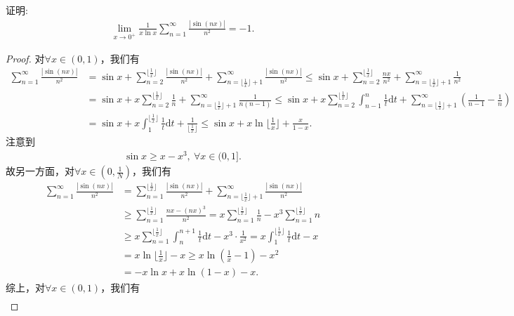 \documentclass[../../main.tex]{subfiles}%
\begin{document}
\begin{example}
证明:
\begin{align*}
\lim_{x \to 0^+} \frac{1}{x \ln x} \sum_{n=1}^{\infty} \frac{|\sin(nx)|}{n^2} = -1.
\end{align*}
\end{example}
\begin{proof}
对$\forall x\in (0,1)$，我们有
\begin{align*}
\sum_{n=1}^{\infty}\frac{|\sin(nx)|}{n^2} &= \sin x + \sum_{n=2}^{\lfloor \frac{1}{x} \rfloor}\frac{|\sin(nx)|}{n^2} + \sum_{n=\lfloor \frac{1}{x} \rfloor +1}^{\infty}\frac{|\sin(nx)|}{n^2} \leqslant \sin x + \sum_{n=2}^{\lfloor \frac{1}{x} \rfloor}\frac{nx}{n^2} + \sum_{n=\lfloor \frac{1}{x} \rfloor +1}^{\infty}\frac{1}{n^2} \\
&= \sin x + x\sum_{n=2}^{\lfloor \frac{1}{x} \rfloor}\frac{1}{n} + \sum_{n=\lfloor \frac{1}{x} \rfloor +1}^{\infty}\frac{1}{n(n-1)} \leqslant \sin x + x\sum_{n=2}^{\lfloor \frac{1}{x} \rfloor}\int_{n-1}^n\frac{1}{t}\mathrm{d}t + \sum_{n=\lfloor \frac{1}{x} \rfloor +1}^{\infty}\left( \frac{1}{n-1} - \frac{1}{n} \right) \\
&= \sin x + x\int_1^{\lfloor \frac{1}{x} \rfloor}\frac{1}{t}\mathrm{d}t + \frac{1}{\lfloor \frac{1}{x} \rfloor} \leqslant \sin x + x\ln \lfloor \frac{1}{x} \rfloor + \frac{x}{1-x}.
\end{align*}
注意到
\begin{align*}
\sin x\geqslant x-x^3,\ \forall x\in (0,1].
\end{align*}
故另一方面，对$\forall x\in (0,\frac{1}{N})$，我们有
\begin{align*}
\sum_{n=1}^{\infty}\frac{|\sin(nx)|}{n^2}&=\sum_{n=1}^{\lfloor \frac{1}{x} \rfloor}\frac{|\sin(nx)|}{n^2}+\sum_{n=\lfloor \frac{1}{x} \rfloor +1}^{\infty}\frac{|\sin(nx)|}{n^2} \\
&\geqslant \sum_{n=1}^{\lfloor \frac{1}{x} \rfloor}\frac{nx-(nx)^3}{n^2}=x\sum_{n=1}^{\lfloor \frac{1}{x} \rfloor}\frac{1}{n}-x^3\sum_{n=1}^{\lfloor \frac{1}{x} \rfloor}n \\
&\geqslant x\sum_{n=1}^{\lfloor \frac{1}{x} \rfloor}\int_n^{n+1}\frac{1}{t}\mathrm{d}t-x^3\cdot \frac{1}{x^2}=x\int_1^{\lfloor \frac{1}{x} \rfloor}\frac{1}{t}\mathrm{d}t-x \\
&=x\ln \lfloor \frac{1}{x} \rfloor -x\geqslant x\ln \left( \frac{1}{x}-1 \right) -x^2\\
&=-x\ln x+x\ln \left( 1-x \right) -x.
\end{align*}
综上，对$\forall x\in (0,1)$，我们有
\begin{align*}

\end{align*}
\end{proof}
\end{document}
